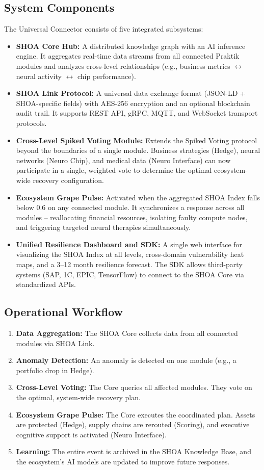 \documentclass[12pt]{article}
\begin{document}
\subsection{System Components}
The Universal Connector consists of five integrated subsystems:
\begin{itemize}
    \item \textbf{SHOA Core Hub:} A distributed knowledge graph with an AI inference engine. It aggregates real-time data streams from all connected Praktik modules and analyzes cross-level relationships (e.g., business metrics $\leftrightarrow$ neural activity $\leftrightarrow$ chip performance).
    \item \textbf{SHOA Link Protocol:} A universal data exchange format (JSON-LD + SHOA-specific fields) with AES-256 encryption and an optional blockchain audit trail. It supports REST API, gRPC, MQTT, and WebSocket transport protocols.
    \item \textbf{Cross-Level Spiked Voting Module:} Extends the Spiked Voting protocol beyond the boundaries of a single module. Business strategies (Hedge), neural networks (Neuro Chip), and medical data (Neuro Interface) can now participate in a single, weighted vote to determine the optimal ecosystem-wide recovery configuration.
    \item \textbf{Ecosystem Grape Pulse:} Activated when the aggregated SHOA Index falls below 0.6 on any connected module. It synchronizes a response across all modules -- reallocating financial resources, isolating faulty compute nodes, and triggering targeted neural therapies simultaneously.
    \item \textbf{Unified Resilience Dashboard and SDK:} A single web interface for visualizing the SHOA Index at all levels, cross-domain vulnerability heat maps, and a 3--12 month resilience forecast. The SDK allows third-party systems (SAP, 1C, EPIC, TensorFlow) to connect to the SHOA Core via standardized APIs.
\end{itemize}

\subsection{Operational Workflow}
\begin{enumerate}
    \item \textbf{Data Aggregation:} The SHOA Core collects data from all connected modules via SHOA Link.
    \item \textbf{Anomaly Detection:} An anomaly is detected on one module (e.g., a portfolio drop in Hedge).
    \item \textbf{Cross-Level Voting:} The Core queries all affected modules. They vote on the optimal, system-wide recovery plan.
    \item \textbf{Ecosystem Grape Pulse:} The Core executes the coordinated plan. Assets are protected (Hedge), supply chains are rerouted (Scoring), and executive cognitive support is activated (Neuro Interface).
    \item \textbf{Learning:} The entire event is archived in the SHOA Knowledge Base, and the ecosystem's AI models are updated to improve future responses.
\end{enumerate}
\end{document}
